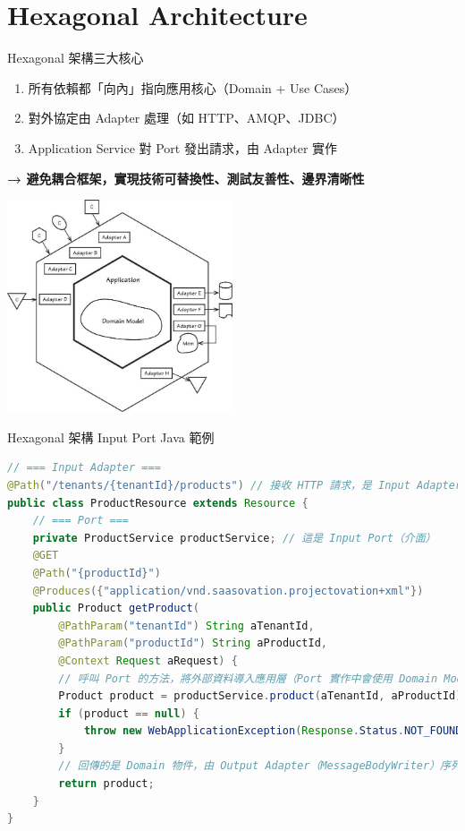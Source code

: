 \documentclass[UTF8]{beamer}
\begin{document}
\section{Hexagonal Architecture}
\begin{frame}{Hexagonal 架構三大核心}
    \begin{enumerate}
        \item 所有依賴都「向內」指向應用核心（Domain + Use Cases）
        \item 對外協定由 Adapter 處理（如 HTTP、AMQP、JDBC）
        \item Application Service 對 Port 發出請求，由 Adapter 實作
    \end{enumerate}
    \vspace{0.5em}
    \textbf{→ 避免耦合框架，實現技術可替換性、測試友善性、邊界清晰性}
    \begin{center}
        \includegraphics[width=0.5\textwidth]{img/hexagonal-architecture.png}
    \end{center}
\end{frame}

\begin{frame}[fragile]{Hexagonal 架構 Input Port Java 範例}
    \scriptsize
    \begin{lstlisting}[language=Java]
// === Input Adapter ===
@Path("/tenants/{tenantId}/products") // 接收 HTTP 請求，是 Input Adapter
public class ProductResource extends Resource {
    // === Port ===
    private ProductService productService; // 這是 Input Port（介面）
    @GET
    @Path("{productId}")
    @Produces({"application/vnd.saasovation.projectovation+xml"})
    public Product getProduct(
        @PathParam("tenantId") String aTenantId,
        @PathParam("productId") String aProductId,
        @Context Request aRequest) {
        // 呼叫 Port 的方法，將外部資料導入應用層（Port 實作中會使用 Domain Model）
        Product product = productService.product(aTenantId, aProductId);
        if (product == null) {
            throw new WebApplicationException(Response.Status.NOT_FOUND);
        }
        // 回傳的是 Domain 物件，由 Output Adapter（MessageBodyWriter）序列化為 XML
        return product;
    }
}
\end{lstlisting}
\end{frame}
\end{document}
